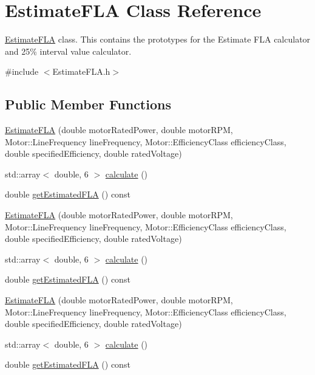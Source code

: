 \hypertarget{class_estimate_f_l_a}{}\section{Estimate\+F\+LA Class Reference}
\label{class_estimate_f_l_a}


\hyperlink{class_estimate_f_l_a}{Estimate\+F\+LA} class. This contains the prototypes for the Estimate F\+LA calculator and 25\% interval value calculator.  




{\ttfamily \#include $<$Estimate\+F\+L\+A.\+h$>$}

\subsection*{Public Member Functions}
\begin{DoxyCompactItemize}
\item 
\hyperlink{class_estimate_f_l_a_ace098c4a684eb4926b20322cf65da32d}{Estimate\+F\+LA} (double motor\+Rated\+Power, double motor\+R\+PM, Motor\+::\+Line\+Frequency line\+Frequency, Motor\+::\+Efficiency\+Class efficiency\+Class, double specified\+Efficiency, double rated\+Voltage)
\item 
std\+::array$<$ double, 6 $>$ \hyperlink{class_estimate_f_l_a_a89b9f73ef39f297c0358440523d14fca}{calculate} ()
\item 
double \hyperlink{class_estimate_f_l_a_adcb6eef313c8184f52b9ca038fbeddaa}{get\+Estimated\+F\+LA} () const
\item 
\hyperlink{class_estimate_f_l_a_ace098c4a684eb4926b20322cf65da32d}{Estimate\+F\+LA} (double motor\+Rated\+Power, double motor\+R\+PM, Motor\+::\+Line\+Frequency line\+Frequency, Motor\+::\+Efficiency\+Class efficiency\+Class, double specified\+Efficiency, double rated\+Voltage)
\item 
std\+::array$<$ double, 6 $>$ \hyperlink{class_estimate_f_l_a_abb1ddcf8de5772322e2e75c8d041f740}{calculate} ()
\item 
double \hyperlink{class_estimate_f_l_a_adcb6eef313c8184f52b9ca038fbeddaa}{get\+Estimated\+F\+LA} () const
\item 
\hyperlink{class_estimate_f_l_a_ace098c4a684eb4926b20322cf65da32d}{Estimate\+F\+LA} (double motor\+Rated\+Power, double motor\+R\+PM, Motor\+::\+Line\+Frequency line\+Frequency, Motor\+::\+Efficiency\+Class efficiency\+Class, double specified\+Efficiency, double rated\+Voltage)
\item 
std\+::array$<$ double, 6 $>$ \hyperlink{class_estimate_f_l_a_abb1ddcf8de5772322e2e75c8d041f740}{calculate} ()
\item 
double \hyperlink{class_estimate_f_l_a_adcb6eef313c8184f52b9ca038fbeddaa}{get\+Estimated\+F\+LA} () const
\end{DoxyCompactItemize}



